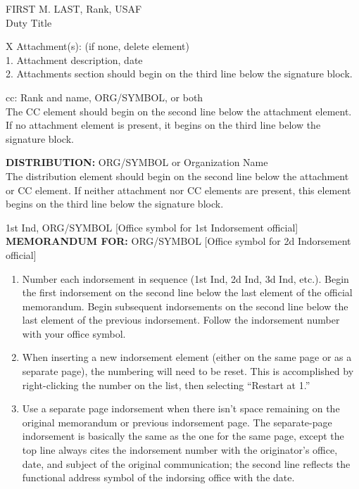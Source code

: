 \documentclass[12pt]{article}
\begin{document}
\begin{RaggedRight}
\vspace{1in} %
\noindent FIRST M. LAST, Rank, USAF\\
Duty Title
\newpage

\noindent X Attachment(s): (if none, delete element)\\
1. Attachment description, date\\
2. Attachments section should begin on the third line below the signature block.

\noindent cc: Rank and name, ORG/SYMBOL, or both\\
The CC element should begin on the second line below the attachment element. If no attachment element is present, it begins on the third line below the signature block.

\noindent \textbf{DISTRIBUTION:} ORG/SYMBOL or Organization Name\\
The distribution element should begin on the second line below the attachment or CC element. If neither attachment nor CC elements are present, this element begins on the third line below the signature block.

\noindent 1st Ind, ORG/SYMBOL [Office symbol for 1st Indorsement official]\\

\noindent \textbf{MEMORANDUM FOR:} ORG/SYMBOL [Office symbol for 2d Indorsement official]

\begin{enumerate}
    \item Number each indorsement in sequence (1st Ind, 2d Ind, 3d Ind, etc.). Begin the first indorsement on the second line below the last element of the official memorandum. Begin subsequent indorsements on the second line below the last element of the previous indorsement. Follow the indorsement number with your office symbol.
    \item When inserting a new indorsement element (either on the same page or as a separate page), the numbering will need to be reset. This is accomplished by right-clicking the number on the list, then selecting “Restart at 1.”
    \item Use a separate page indorsement when there isn’t space remaining on the original memorandum or previous indorsement page. The separate-page indorsement is basically the same as the one for the same page, except the top line always cites the indorsement number with the originator’s office, date, and subject of the original communication; the second line reflects the functional address symbol of the indorsing office with the date.
\end{enumerate}


\end{RaggedRight}
\end{document}
